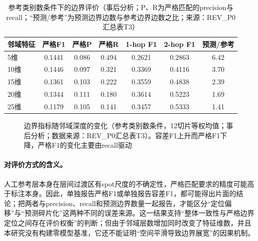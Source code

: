 \begin{table}[htbp]
\centering
\caption{参考类别数条件下的边界评价（事后分析；P、R为严格匹配的precision与recall；“预测/参考”为预测边界边数与参考边界边数之比；来源：REV\_P0汇总表T3）}
\label{tab:cc-boundary-p1}
\small
\begin{tabular}{lcccccc}
\toprule
邻域特征 & 严格F1 & 严格P & 严格R & 1-hop F1 & 2-hop F1 & 预测/参考\\
\midrule
5维 & 0.1441 & 0.086 & 0.494 & 0.2621 & 0.2863 & 6.42\\
10维 & 0.1446 & 0.097 & 0.321 & 0.3369 & 0.4116 & 3.70\\
15维 & 0.1361 & 0.103 & 0.222 & 0.3559 & 0.4838 & 2.39\\
20维 & 0.1344 & 0.111 & 0.180 & 0.3614 & 0.5223 & 1.69\\
25维 & 0.1179 & 0.105 & 0.141 & 0.3457 & 0.5333 & 1.41\\
\bottomrule
\end{tabular}
\end{table}

\begin{figure}[htbp]
\centering
{}
\caption{边界指标随邻域深度的变化（参考类别数条件，12切片等权均值；事后分析；数据来源：REV\_P0汇总表T3）。容差F1上升而严格F1下降，严格F1的变化主要由recall驱动}
\label{fig:cc-boundary-p1}
\end{figure}

\paragraph{对评价方式的含义。}人工参考层本身在层间过渡区有spot尺度的不确定性，严格匹配要求的精度可能高于标注本身。因此，单独报告严格F1或单独报告容差F1，都可能得出片面的结论；把两者与precision、recall和预测边界数量一起报告，才能区分“定位偏移”与“预测碎片化”这两种不同的误差来源。这一结果支持“整体一致性与严格边界定位之间存在评价权衡”的判断；但由于邻域层数增加同时改变了特征维数，并且本研究没有构建零模型基准，它还不能证明“空间平滑导致边界展宽”的因果机制。

